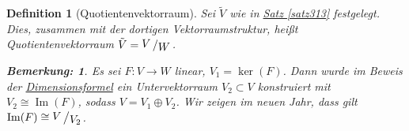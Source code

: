 \documentclass{report}
\DeclareMathOperator{\Ima}{Im}
\theoremstyle{customrem}
\newtheorem*{bem}{Bemerkung\textnormal:}
\theoremstyle{customdef}
\newtheorem{definition}{Definition}[chapter]
\newcommand{\bigslant}[2]{{\raisebox{.1em}{$#1$}\left/\raisebox{-.2em}{$#2$}\right.}}
\begin{document}
	\begin{definition}[Quotientenvektorraum]
		Sei $\tilde{V}$ wie in \hyperref[satz313]{Satz \ref{satz313}} festgelegt. Dies, zusammen mit der dortigen Vektorraumstruktur, heißt Quotientenvektorraum $\tilde{V} = \bigslant{V}{W}$.\\
		\begin{bem}
			Es sei $F:V\to W$ linear, $V_1 = \ker(F)$. Dann wurde im Beweis der \hyperref[satz37]{Dimensionsformel} ein Untervektorraum $V_2\subset V$ konstruiert mit $V_2 \cong \Ima(F)$, sodass $V = V_1\oplus V_2$. Wir zeigen im neuen Jahr, dass gilt $\Ima(F)\cong \bigslant{V}{V_2}$.
		\end{bem}
	\end{definition}
	
\newpage
\renewcommand{\listtheoremname}{Satz- und Definitionsverzeichnis}
\listoftheorems[ignoreall, show={definition}, show={satz}, show={lemma}, show={definitionn}, show={korrolar}]
\newpage
\printindex
\end{document}
